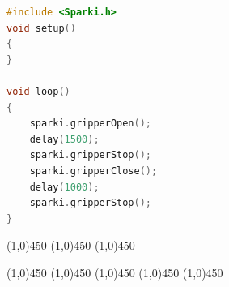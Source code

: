 
    \begin{lstlisting}[language=C]
#include <Sparki.h>
void setup()
{
}

void loop()
{
    sparki.gripperOpen();  
    delay(1500);           
    sparki.gripperStop();
    sparki.gripperClose();  
    delay(1000);           
    sparki.gripperStop();
}
\end{lstlisting}

\begin{center}
    \line(1,0){450}
    \vspace{0.2cm}   
    \line(1,0){450}
    \vspace{0.2cm}   
    \line(1,0){450}
    \vspace{0.4cm}   
\end{center}


\begin{center}
    \line(1,0){450}
    \vspace{0.2cm}   
    \line(1,0){450}
    \vspace{0.2cm}   
    \line(1,0){450}
    \vspace{0.2cm}   
    \line(1,0){450}
    \vspace{0.2cm}   
    \line(1,0){450}
    \vspace{0.4cm} 
\end{center}

    
    